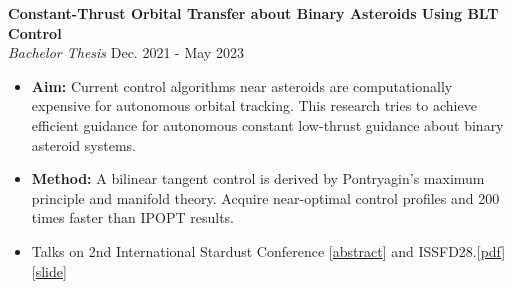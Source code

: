 \documentclass[11pt, a4paper]{article}
\begin{document}
\begin{researchitem}
    \item \textbf{Constant-Thrust Orbital Transfer about Binary Asteroids Using BLT Control}  \\
    \textit{Bachelor Thesis} \hfill Dec. 2021 - May 2023
    \begin{itemize}[noitemsep, topsep=0pt]
        \item \textbf{Aim:} Current control algorithms near asteroids are computationally expensive for autonomous orbital tracking. This research tries to achieve efficient guidance for autonomous constant low-thrust guidance about binary asteroid systems.
        \item \textbf{Method:} A bilinear tangent control is derived by Pontryagin’s maximum principle and manifold theory. Acquire near-optimal control profiles and 200 times faster than IPOPT results. 
        \item Talks on 2nd International Stardust Conference [\href{https://indico.cern.ch/event/1158038/contributions/5112098/attachments/2537697/4367855/ZicenXiong_NearOptimalFiniteThrustObitalControlNearABinaryAsteroidSystem_Xiong.pdf}{abstract}] and ISSFD28.[\href{https://issfd-28.casconf.cn/static/1474711509593624577/pages/file/191f4ea3ad564ddf93bcccf7b4e5248e.pdf}{pdf}][\href{https://zcen-xiong.github.io/research/ISSFD-146.pdf}{slide}]
    \end{itemize}
\end{researchitem}

\end{document}
